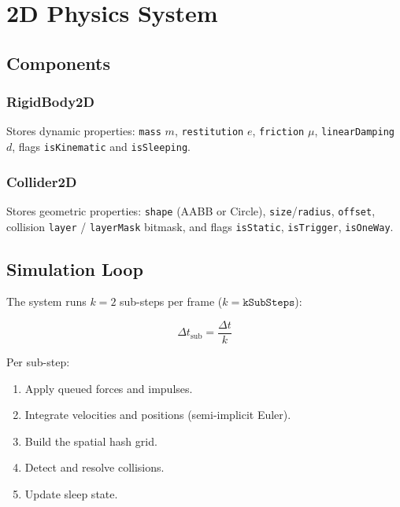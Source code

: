 \chapter{2D Physics System}

\section{Components}

\subsection{RigidBody2D}

Stores dynamic properties: \texttt{mass} $m$, \texttt{restitution} $e$,
\texttt{friction} $\mu$, \texttt{linearDamping} $d$, flags
\texttt{isKinematic} and \texttt{isSleeping}.

\subsection{Collider2D}

Stores geometric properties: \texttt{shape} (AABB or Circle),
\texttt{size}/\texttt{radius}, \texttt{offset}, collision
\texttt{layer} / \texttt{layerMask} bitmask, and flags
\texttt{isStatic}, \texttt{isTrigger}, \texttt{isOneWay}.

\section{Simulation Loop}

The system runs $k = 2$ sub-steps per frame ($k = \texttt{kSubSteps}$):

\begin{equation}
\Delta t_\text{sub} = \frac{\Delta t}{k}
\end{equation}

Per sub-step:
\begin{enumerate}
  \item Apply queued forces and impulses.
  \item Integrate velocities and positions (semi-implicit Euler).
  \item Build the spatial hash grid.
  \item Detect and resolve collisions.
  \item Update sleep state.
\end{enumerate}

